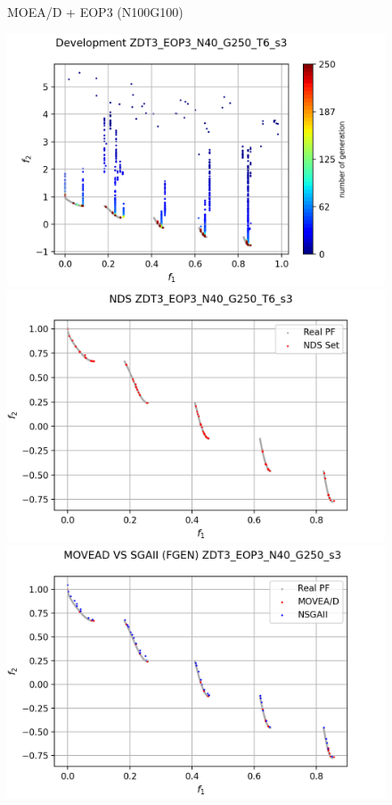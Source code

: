 \begin{minipage}[H]{\linewidth}
\begin{minipage}[b]{0.3\linewidth}
\begin{figure}[H]
        \caption{\centering MOEA/D + EOP3 (N100G100)}
        \label{fig:18}
    \end{figure}
\end{minipage} \quad
\begin{minipage}[b]{0.3\linewidth}
\begin{figure}[H]
        \centering
        \includegraphics[scale=0.4]{figures/ZDT3_EOP3_N40_G250_T6/s3_dev.png}\\
        \includegraphics[scale=0.36]{figures/ZDT3_EOP3_N40_G250_T6/s3_nds.png}\\
        \includegraphics[scale=0.36]{figures/ZDT3_EOP3_N40_G250_T6/s3_comp.png}\\

\end{figure}
\end{minipage}
\end{minipage}
